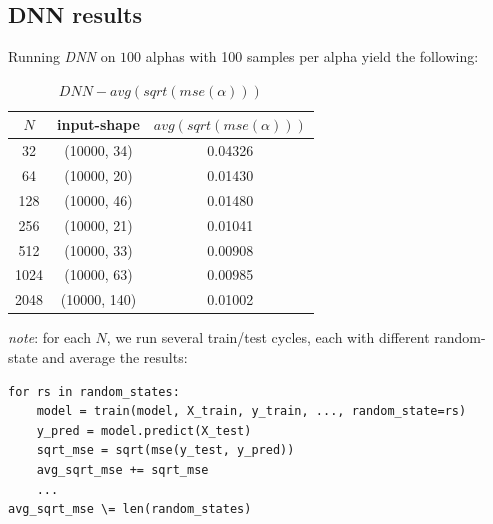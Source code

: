 \documentclass[a4paper, 12pt]{report}
\begin{document}
\pagebreak
\subsection{DNN results}
\par Running \textit{DNN} on $100$ alphas with 100 samples per alpha yield the following:

\begin{table}[h!]
    \centering
    \begin{tabular}{||c c c||} 
        \hline
        $N$ & input-shape & $avg(sqrt(mse(\alpha)))$ \\ [0.5ex] 
        \hline\hline
        32 & (10000, 34) & 0.04326 \\ 
        \hline
        64 & (10000, 20) & 0.01430 \\
        \hline
        128 & (10000, 46) & 0.01480 \\
        \hline
        256 & (10000, 21) & 0.01041 \\
        \hline
        512 & (10000, 33) & 0.00908 \\ 
        \hline
        1024 & (10000, 63) & 0.00985 \\ 
        \hline
        2048 & (10000, 140) & 0.01002 \\ 
        \hline
    \end{tabular}
    \caption[$mse(\alpha)$ for $DNN$]{$DNN - avg(sqrt(mse(\alpha)))$}
    \label{table:dnn-sqrt-mse}
\end{table}

\textit{note}: for each $N$, we run several train/test cycles, each with different random-state and average the results:
\begin{verbatim}
for rs in random_states:
    model = train(model, X_train, y_train, ..., random_state=rs)
    y_pred = model.predict(X_test)
    sqrt_mse = sqrt(mse(y_test, y_pred))
    avg_sqrt_mse += sqrt_mse
    ...
avg_sqrt_mse \= len(random_states)
\end{verbatim}
\end{document}
